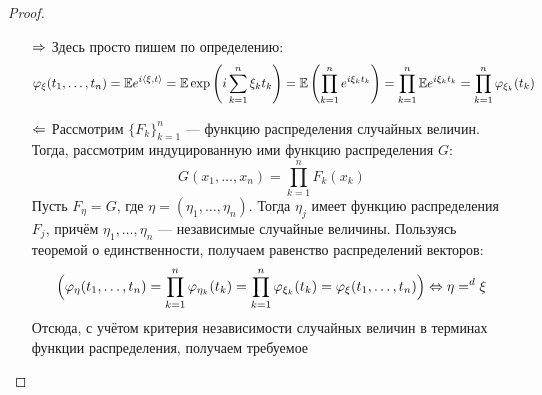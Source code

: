 \begin{proof}~
	\begin{itemize}
		\item[$\Rightarrow$] Здесь просто пишем по определению:
		\[
			\varphi_\xi(t_1, \ldots, t_n) = \mathbb{E} e^{i\left\langle\xi, t\right\rangle} = \mathbb{E}\exp\left(i \sum_{k = 1}^n \xi_k t_k\right) = \mathbb{E}\left(\prod_{k = 1}^n e^{i\xi_k t_k}\right) = \prod_{k = 1}^n \mathbb{E} e^{i\xi_k t_k} = \prod_{k = 1}^n \varphi_{\xi_k}(t_k)
		\]
		
		\item[$\Leftarrow$] Рассмотрим $\{F_k\}_{k = 1}^n$ --- функцию распределения случайных величин. Тогда, рассмотрим индуцированную ими функцию распределения $G$:
		\[
			G(x_1, \ldots, x_n) = \prod_{k = 1}^n F_k(x_k)
		\]
		Пусть $F_\eta = G$, где $\eta = (\eta_1, \ldots, \eta_n)$. Тогда $\eta_j$ имеет функцию распределения $F_j$, причём $\eta_1, \ldots, \eta_n$ --- независимые случайные величины. Пользуясь теоремой о единственности, получаем равенство распределений векторов:
		\[
			\Big(\varphi_\eta(t_1, \ldots, t_n) = \prod_{k = 1}^n \varphi_{\eta_k}(t_k) = \prod_{k = 1}^n \varphi_{\xi_k}(t_k) = \varphi_\xi(t_1, \ldots, t_n)\Big) \Leftrightarrow \eta =^d \xi
		\]
		Отсюда, с учётом критерия независимости случайных величин в терминах функции распределения, получаем требуемое
	\end{itemize}
\end{proof}